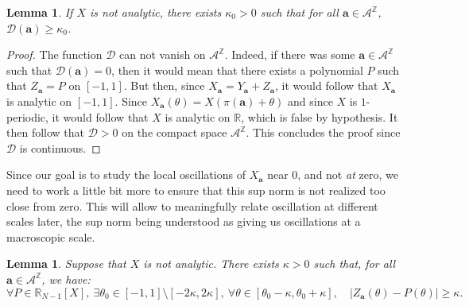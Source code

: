 \documentclass[11pt]{amsart}
\theoremstyle{plain}
\newtheorem{lemma}[theorem]{Lemma}
\theoremstyle{definition}
\numberwithin{equation}{section}
\begin{document}
\begin{lemma}
If $X$ is not analytic, there exists $\kappa_0>0$ such that for all $\mathbf{a} \in \mathcal{A}^\mathbb{Z}$,  $\mathcal{D}(\mathbf{a})\geq\kappa_0$.
\end{lemma}

\begin{proof}
The function $\mathcal{D}$ can not vanish on $\mathcal{A}^\mathbb{Z}$.
Indeed, if there was some $\mathbf{a} \in \mathcal{A}^\mathbb{Z}$ such that $\mathcal{D}(\mathbf{a})=0$, then it would mean that there exists a polynomial $P$ such that $Z_\mathbf{a}=P$ on $[-1,1]$. But then, since $X_\mathbf{a}=Y_\mathbf{a}+Z_\mathbf{a}$, it would follow that $X_\mathbf{a}$ is analytic on $[-1,1]$. Since $X_\mathbf{a}(\theta)=X(\pi(\mathbf{a})+\theta)$ and since $X$ is $1$-periodic, it would follow that $X$ is analytic on $\mathbb{R}$, which is false by hypothesis.
It then follow that $\mathcal{D}>0$ on the compact space $\mathcal{A}^\mathbb{Z}$.
This concludes the proof since $\mathcal{D}$ is continuous.
\end{proof}

Since our goal is to study the local oscillations of $X_\mathbf{a}$ near $0$, and not \emph{at} zero, we need to work a little bit more to ensure that this sup norm is not realized too close from zero. This will allow to meaningfully relate oscillation at different scales later, the sup norm being understood as giving us oscillations at a macroscopic scale.

\begin{lemma}
Suppose that $X$ is not analytic. There exists $\kappa >0$ such that, for all $\mathbf{a} \in \mathcal{A}^\mathbb{Z}$, we have:
$$ \forall  P \in \mathbb{R}_{N-1}[X], \ \exists \theta_0 \in [-1,1] \setminus [-2\kappa,2\kappa], \ \forall \theta \in [\theta_0-\kappa,\theta_0+\kappa], \quad |Z_\mathbf{a}(\theta)-P(\theta)| \geq \kappa. $$
\end{lemma}
\end{document}
